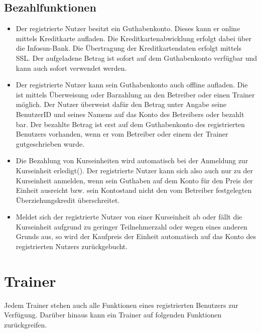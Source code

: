 \documentclass[a4paper]{scrreprt}
\newcounter{Lc}
\newcounter{Hc}
\newcommand{\stepHc}{\stepcounter{Hc}\setcounter{Lc}{0}}
\begin{document}
\subsection{Bezahlfunktionen}
\begin{itemize}
	\item {}
	Der registrierte Nutzer besitzt ein Guthabenkonto. Dieses kann er online mittels Kreditkarte aufladen. Die Kreditkartenabwicklung erfolgt dabei
	über die Infosun-Bank. Die Übertragung der Kreditkartendaten erfolgt mittels SSL. Der aufgeladene Betrag ist sofort auf dem Guthabenkonto verfügbar und kann auch sofort verwendet werden.
	\item {}
	Der registrierte Nutzer kann sein Guthabenkonto auch offline aufladen. Die ist mittels Überweisung oder Barzahlung an den Betreiber oder einen Trainer möglich. 
	Der Nutzer überweist dafür den Betrag unter Angabe seine BenutzerID und seines Namens  auf das Konto des Betreibers oder bezahlt bar. Der bezahlte Betrag ist erst auf dem Guthabenkonto des registrierten Benutzers vorhanden, wenn er vom Betreiber oder einem der Trainer gutgeschrieben wurde.
	\item {}
	Die Bezahlung von Kurseinheiten wird automatisch bei der Anmeldung zur Kurseinheit erledigt(). Der registrierte Nutzer kann sich also auch nur zu der Kurseinheit anmelden, wenn sein Guthaben auf dem Konto für den Preis der Einheit ausreicht bzw. sein Kontostand nicht den vom Betreiber festgelegten Überziehungskredit überschreitet.
	\item {}
	Meldet sich der registrierte Nutzer von einer Kurseinheit ab oder fällt die Kurseinheit aufgrund zu geringer Teilnehmerzahl oder wegen eines anderen Grunds aus, so wird der Kaufpreis der Einheit automatisch auf das Konto des registrierten Nutzers zurückgebucht.
\end{itemize}	

\section{Trainer}
Jedem Trainer stehen auch alle Funktionen eines registrierten Benutzers zur Verfügung. Darüber hinaus kann ein Trainer auf folgenden Funktionen zurückgreifen.
\stepHc
\end{document}

